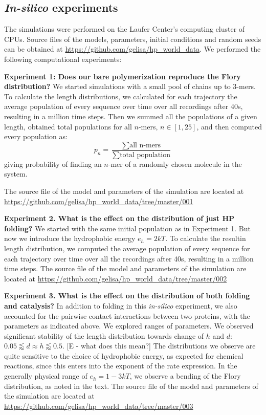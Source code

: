 \documentclass[twocolumn,letterpaper]{revtex4}
\begin{document}
\subsection*{\textit{In-silico} experiments}\label{sec:experiments}
The simulations were performed on the Laufer Center's computing cluster of CPUs. 
Source files of the models, parameters, initial conditions and random seeds can be obtained at 
\url{https://github.com/gelisa/hp_world_data}.  We performed the following computational 
experiments:


\textbf{Experiment 1: Does our bare polymerization reproduce the Flory 
distribution?}\label{sec:expt1}
We started simulations with a small pool of chains up to 3-mers. To calculate the length 
distributions, 
we calculated for each trajectory the average population of every sequence over time over all 
recordings after 40s, resulting in a million time steps.  Then we summed all the populations of a 
given 
length, obtained total populations for all $n$-mers, $n\in[1,25]$, and then computed every 
population as:
\begin{equation}
 p_n = \frac{\sum\mbox{all n-mers}}{\sum\mbox{total population}}
\end{equation}
giving probability of finding an $n$-mer of a randomly chosen molecule in the system.

The source file of the model and parameters of the simulation are located at 
\url{https://github.com/gelisa/hp_world_data/tree/master/001}

\textbf{Experiment 2. What is the effect on the distribution of just HP folding?}
We started with the same initial population as in Experiment 1. But now we introduce the 
hydrophobic 
energy $e_h= 2kT$. To calculate the resultin length distribution, we computed the average 
population 
of every sequence for each trajectory over time over all the recordings after 40s, resulting in a 
million time steps. The source file of the model and parameters of the 
simulation are located at \url{https://github.com/gelisa/hp_world_data/tree/master/002}


\textbf{Experiment 3. What is the effect on the distribution of both folding and catalysis?}
In addition to folding in this \textit{in-silico} experiment, we also accounted for the pairwise 
contact interactions between two proteins, with the parameters as indicated above. We explored 
ranges of parameters.  We observed significant stability of the length distribution towards change 
of $h$ and $d$: $0.05\lessapprox d\approx h \lessapprox 0.5$. [E - what does this mean?]  The 
distributions we observe are quite sensitive to the choice of hydrophobic energy, as expected for 
chemical reactions, since this enters into the exponent of the rate expression. In the generally 
physical range of $e_h= 1-3 kT$, we observe a bending of the Flory distribution, as noted in the 
text. The source file of the model and parameters of the 
simulation are located at \url{https://github.com/gelisa/hp_world_data/tree/master/003}



 
\end{document}

